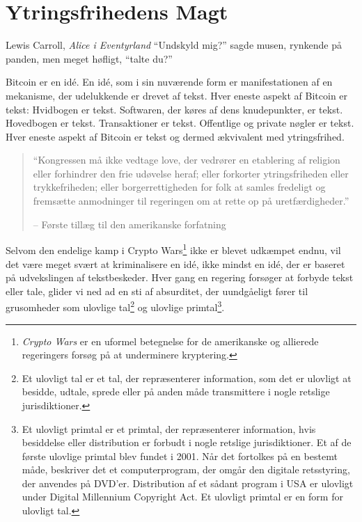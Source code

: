 
\chapter{Ytringsfrihedens Magt}
\label{les:6}

\begin{chapquote}{Lewis Carroll, \textit{Alice i Eventyrland}}
\enquote{Undskyld mig?} sagde musen, rynkende på panden, men meget høfligt, 
\enquote{talte du?}
\end{chapquote}

Bitcoin er en idé. En idé, som i sin nuværende form er manifestationen af en 
mekanisme, der udelukkende er drevet af tekst. Hver eneste aspekt af Bitcoin 
er tekst: Hvidbogen er tekst. Softwaren, der køres af dens knudepunkter, er 
tekst. Hovedbogen er tekst. Transaktioner er tekst. Offentlige og private 
nøgler er tekst. Hver eneste aspekt af Bitcoin er tekst og dermed ækvivalent 
med ytringsfrihed.

\begin{quotation}\begin{samepage}
\enquote{Kongressen må ikke vedtage love, der vedrører en etablering af religion
eller forhindrer den frie udøvelse heraf; eller forkorter ytringsfriheden eller
trykkefriheden; eller borgerrettigheden for folk at samles fredeligt og
fremsætte anmodninger til regeringen om at rette op på uretfærdigheder.}
\begin{flushright} -- Første tillæg til den amerikanske forfatning
\end{flushright}\end{samepage}\end{quotation}

Selvom den endelige kamp i Crypto Wars\footnote{\textit{Crypto Wars} er en 
uformel betegnelse for de amerikanske og allierede regeringers forsøg på at 
underminere kryptering.\cite{eff-cryptowars}\cite{wiki:cryptowars}} ikke er 
blevet udkæmpet endnu, vil det være meget svært at kriminalisere en idé, ikke 
mindst en idé, der er baseret på udvekslingen af tekstbeskeder. Hver gang en 
regering forsøger at forbyde tekst eller tale, glider vi ned ad en sti af 
absurditet, der uundgåeligt fører til grusomheder som ulovlige tal\footnote{Et 
ulovligt tal er et tal, der repræsenterer information, som det er ulovligt at 
besidde, udtale, sprede eller på anden måde transmittere i nogle retslige 
jurisdiktioner.\cite{wiki:illegal-number}} og ulovlige primtal\footnote{Et 
ulovligt primtal er et primtal, der repræsenterer information, hvis besiddelse 
eller distribution er forbudt i nogle retslige jurisdiktioner. Et af de første 
ulovlige primtal blev fundet i 2001. Når det fortolkes på en bestemt måde, 
beskriver det et computerprogram, der omgår den digitale retsstyring, der 
anvendes på DVD'er. Distribution af et sådant program i USA er ulovligt under 
Digital Millennium Copyright Act. Et ulovligt primtal er en form for ulovligt 
tal.\cite{wiki:illegal-prime}}.

